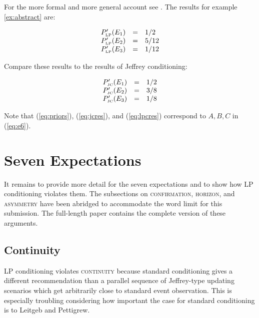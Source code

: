 \documentclass[11pt]{article}
\begin{document}
For the more formal and more general account see
. The results for example
\ref{ex:abstract} are:

\begin{equation}
  \label{eq:lpcres}
  \begin{array}{rcl}
    P'_{\mbox{\tiny LP}}(E_{1})&=&1/2 \\
    P'_{\mbox{\tiny LP}}(E_{2})&=&5/12 \\
    P'_{\mbox{\tiny LP}}(E_{3})&=&1/12
  \end{array}
\end{equation}

Compare these results to the results of Jeffrey conditioning:

\begin{equation}
  \label{eq:jcres}
  \begin{array}{rcl}
    P'_{\mbox{\tiny JC}}(E_{1})&=&1/2 \\
    P'_{\mbox{\tiny JC}}(E_{2})&=&3/8 \\
    P'_{\mbox{\tiny JC}}(E_{3})&=&1/8
  \end{array}
\end{equation}

Note that (\ref{eq:priors}), (\ref{eq:jcres}), and (\ref{eq:lpcres})
correspond to $A,B,C$ in (\ref{eq:e6}). 

\section{Seven Expectations}
\label{fivex}

It remains to provide more detail for the seven expectations and to
show how LP conditioning violates them. The subsections on
\textsc{confirmation}, \textsc{horizon}, and \textsc{asymmetry} have
been abridged to accommodate the word limit for this submission. The
full-length paper contains the complete version of these arguments.

\subsection{Continuity}
\label{Continuity}

LP conditioning violates \textsc{continuity} because standard
conditioning gives a different recommendation than a parallel sequence
of Jeffrey-type updating scenarios which get arbitrarily close to
standard event observation. This is especially troubling considering
how important the case for standard conditioning is to Leitgeb and
Pettigrew.
\end{document}
